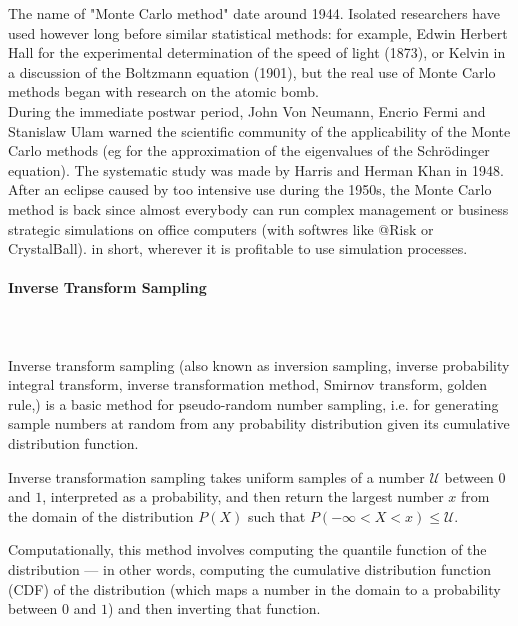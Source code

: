 	\begin{tcolorbox}[title=Remark,colframe=black,arc=10pt]
	The name of "Monte Carlo method" date around 1944. Isolated researchers have used however long before similar statistical methods: for example, Edwin Herbert Hall for the experimental determination of the speed of light (1873), or Kelvin in a discussion of the Boltzmann equation (1901), but the real use of Monte Carlo methods began with research on the atomic bomb.\\

	During the immediate postwar period, John Von Neumann, Encrio Fermi and Stanislaw Ulam warned the scientific community of the applicability of the Monte Carlo methods (eg for the approximation of the eigenvalues of the Schrödinger equation). The systematic study was made by Harris and Herman Khan in 1948. After an eclipse caused by too intensive use during the 1950s, the Monte Carlo method is back since almost everybody can run complex management or business strategic simulations on office computers (with softwres like @Risk or CrystalBall).  in short, wherever it is profitable to use simulation processes.
	\end{tcolorbox}
	
	\pagebreak
	\paragraph{Inverse Transform Sampling}\label{inverse transform sampling}\mbox{}\\\\
	Inverse transform sampling (also known as inversion sampling,  inverse probability integral transform, inverse transformation method, Smirnov transform, golden rule,) is a basic method for pseudo-random number sampling, i.e. for generating sample numbers at random from any probability distribution given its cumulative distribution function.
	
	Inverse transformation sampling takes uniform samples of a number $\mathcal{U}$ between $0$ and $1$, interpreted as a probability, and then return the largest number $x$ from the domain of the distribution $P(X)$ such that $P(-\infty < X < x) \le \mathcal{U}$. 
	
	Computationally, this method involves computing the quantile function of the distribution — in other words, computing the cumulative distribution function (CDF) of the distribution (which maps a number in the domain to a probability between $0$ and $1$) and then inverting that function.
	
